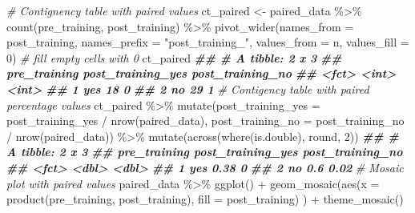 \documentclass[
]{book}
\newenvironment{Shaded}{\begin{snugshade}}{\end{snugshade}}
\newcommand{\AttributeTok}[1]{\textcolor[rgb]{0.77,0.63,0.00}{#1}}
\newcommand{\CommentTok}[1]{\textcolor[rgb]{0.56,0.35,0.01}{\textit{#1}}}
\newcommand{\DecValTok}[1]{\textcolor[rgb]{0.00,0.00,0.81}{#1}}
\newcommand{\DocumentationTok}[1]{\textcolor[rgb]{0.56,0.35,0.01}{\textbf{\textit{#1}}}}
\newcommand{\FunctionTok}[1]{\textcolor[rgb]{0.00,0.00,0.00}{#1}}
\newcommand{\NormalTok}[1]{#1}
\newcommand{\OtherTok}[1]{\textcolor[rgb]{0.56,0.35,0.01}{#1}}
\newcommand{\SpecialCharTok}[1]{\textcolor[rgb]{0.00,0.00,0.00}{#1}}
\newcommand{\StringTok}[1]{\textcolor[rgb]{0.31,0.60,0.02}{#1}}
\begin{document}
\begin{Shaded}
\begin{Highlighting}[]
\CommentTok{\# Contignency table with paired values}
\NormalTok{ct\_paired }\OtherTok{\textless{}{-}}\NormalTok{ paired\_data }\SpecialCharTok{\%\textgreater{}\%}
  \FunctionTok{count}\NormalTok{(pre\_training, post\_training) }\SpecialCharTok{\%\textgreater{}\%}
  \FunctionTok{pivot\_wider}\NormalTok{(}\AttributeTok{names\_from =}\NormalTok{ post\_training,}
              \AttributeTok{names\_prefix =} \StringTok{"post\_training\_"}\NormalTok{,}
              \AttributeTok{values\_from =}\NormalTok{ n,}
              \AttributeTok{values\_fill =} \DecValTok{0}\NormalTok{) }\CommentTok{\# fill empty cells with \textquotesingle{}0\textquotesingle{}}
\NormalTok{ct\_paired}
\DocumentationTok{\#\# \# A tibble: 2 x 3}
\DocumentationTok{\#\#   pre\_training post\_training\_yes post\_training\_no}
\DocumentationTok{\#\#   \textless{}fct\textgreater{}                    \textless{}int\textgreater{}            \textless{}int\textgreater{}}
\DocumentationTok{\#\# 1 yes                         18                0}
\DocumentationTok{\#\# 2 no                          29                1}
\CommentTok{\# Contigency table with paired percentage values}
\NormalTok{ct\_paired }\SpecialCharTok{\%\textgreater{}\%}
  \FunctionTok{mutate}\NormalTok{(}\AttributeTok{post\_training\_yes =}\NormalTok{ post\_training\_yes }\SpecialCharTok{/} \FunctionTok{nrow}\NormalTok{(paired\_data),}
         \AttributeTok{post\_training\_no =}\NormalTok{ post\_training\_no }\SpecialCharTok{/} \FunctionTok{nrow}\NormalTok{(paired\_data)) }\SpecialCharTok{\%\textgreater{}\%}
  \FunctionTok{mutate}\NormalTok{(}\FunctionTok{across}\NormalTok{(}\FunctionTok{where}\NormalTok{(is.double), round, }\DecValTok{2}\NormalTok{))}
\DocumentationTok{\#\# \# A tibble: 2 x 3}
\DocumentationTok{\#\#   pre\_training post\_training\_yes post\_training\_no}
\DocumentationTok{\#\#   \textless{}fct\textgreater{}                    \textless{}dbl\textgreater{}            \textless{}dbl\textgreater{}}
\DocumentationTok{\#\# 1 yes                       0.38             0   }
\DocumentationTok{\#\# 2 no                        0.6              0.02}
\CommentTok{\# Mosaic plot with paired values}
\NormalTok{paired\_data }\SpecialCharTok{\%\textgreater{}\%}
  \FunctionTok{ggplot}\NormalTok{() }\SpecialCharTok{+}
  \FunctionTok{geom\_mosaic}\NormalTok{(}\FunctionTok{aes}\NormalTok{(}\AttributeTok{x =} \FunctionTok{product}\NormalTok{(pre\_training, post\_training),}
                  \AttributeTok{fill =}\NormalTok{ post\_training)}
\NormalTok{              ) }\SpecialCharTok{+}
  \FunctionTok{theme\_mosaic}\NormalTok{()}
\end{Highlighting}
\end{Shaded}
\end{document}
